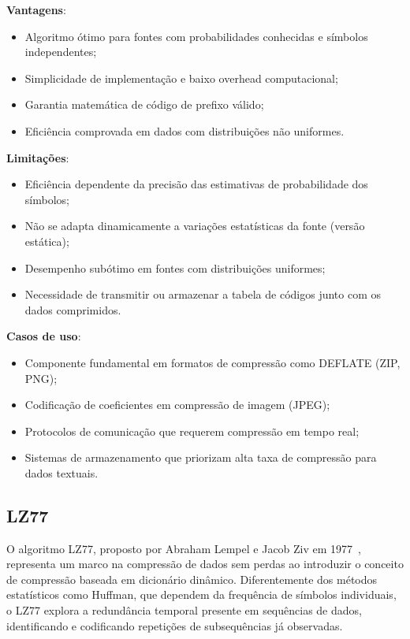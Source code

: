 \textbf{Vantagens}: 
\begin{itemize}
    \item Algoritmo ótimo para fontes com probabilidades conhecidas e símbolos independentes;
    \item Simplicidade de implementação e baixo overhead computacional;
    \item Garantia matemática de código de prefixo válido;
    \item Eficiência comprovada em dados com distribuições não uniformes.
\end{itemize}

\textbf{Limitações}: 
\begin{itemize}
    \item Eficiência dependente da precisão das estimativas de probabilidade dos símbolos;
    \item Não se adapta dinamicamente a variações estatísticas da fonte (versão estática);
    \item Desempenho subótimo em fontes com distribuições uniformes;
    \item Necessidade de transmitir ou armazenar a tabela de códigos junto com os dados comprimidos.
\end{itemize}

\textbf{Casos de uso}: 
\begin{itemize}
    \item Componente fundamental em formatos de compressão como DEFLATE (ZIP, PNG);
    \item Codificação de coeficientes em compressão de imagem (JPEG);
    \item Protocolos de comunicação que requerem compressão em tempo real;
    \item Sistemas de armazenamento que priorizam alta taxa de compressão para dados textuais.
\end{itemize}

\subsection{LZ77}

O algoritmo LZ77, proposto por Abraham Lempel e Jacob Ziv em 1977~\cite{ziv1977universal}, representa um marco na compressão de dados sem perdas ao introduzir o conceito de compressão baseada em dicionário dinâmico. Diferentemente dos métodos estatísticos como Huffman, que dependem da frequência de símbolos individuais, o LZ77 explora a redundância temporal presente em sequências de dados, identificando e codificando repetições de subsequências já observadas.

